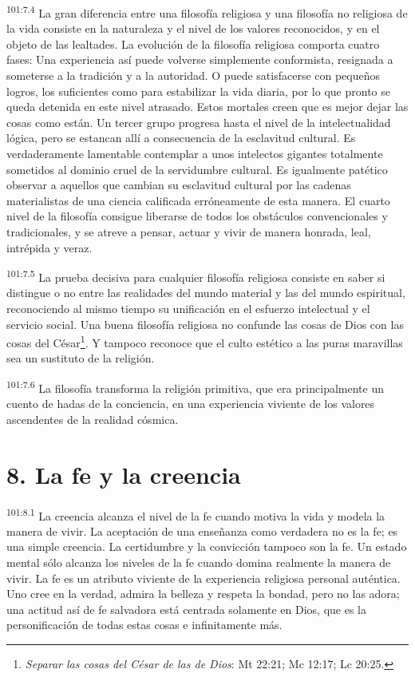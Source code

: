 \par
\textsuperscript{101:7.4} La gran diferencia entre una filosofía religiosa y una filosofía no religiosa de la vida consiste en la naturaleza y el nivel de los valores reconocidos, y en el objeto de las lealtades. La evolución de la filosofía religiosa comporta cuatro fases: Una experiencia así puede volverse simplemente conformista, resignada a someterse a la tradición y a la autoridad. O puede satisfacerse con pequeños logros, los suficientes como para estabilizar la vida diaria, por lo que pronto se queda detenida en este nivel atrasado. Estos mortales creen que es mejor dejar las cosas como están. Un tercer grupo progresa hasta el nivel de la intelectualidad lógica, pero se estancan allí a consecuencia de la esclavitud cultural. Es verdaderamente lamentable contemplar a unos intelectos gigantes totalmente sometidos al dominio cruel de la servidumbre cultural. Es igualmente patético observar a aquellos que cambian su esclavitud cultural por las cadenas materialistas de una ciencia calificada erróneamente de esta manera. El cuarto nivel de la filosofía consigue liberarse de todos los obstáculos convencionales y tradicionales, y se atreve a pensar, actuar y vivir de manera honrada, leal, intrépida y veraz.

\par
\textsuperscript{101:7.5} La prueba decisiva para cualquier filosofía religiosa consiste en saber si distingue o no entre las realidades del mundo material y las del mundo espiritual, reconociendo al mismo tiempo su unificación en el esfuerzo intelectual y el servicio social. Una buena filosofía religiosa no confunde las cosas de Dios con las cosas del César\footnote{\textit{Separar las cosas del César de las de Dios}: Mt 22:21; Mc 12:17; Lc 20:25.}. Y tampoco reconoce que el culto estético a las puras maravillas sea un sustituto de la religión.

\par
\textsuperscript{101:7.6} La filosofía transforma la religión primitiva, que era principalmente un cuento de hadas de la conciencia, en una experiencia viviente de los valores ascendentes de la realidad cósmica.

\section*{8. La fe y la creencia}
\par
\textsuperscript{101:8.1} La creencia alcanza el nivel de la fe cuando motiva la vida y modela la manera de vivir. La aceptación de una enseñanza como verdadera no es la fe; es una simple creencia. La certidumbre y la convicción tampoco son la fe. Un estado mental sólo alcanza los niveles de la fe cuando domina realmente la manera de vivir. La fe es un atributo viviente de la experiencia religiosa personal auténtica. Uno cree en la verdad, admira la belleza y respeta la bondad, pero no las adora; una actitud así de fe salvadora está centrada solamente en Dios, que es la personificación de todas estas cosas e infinitamente más.

